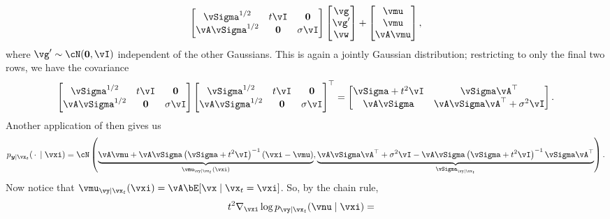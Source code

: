 \documentclass[../../book-main.tex]{subfiles}
\begin{document}
\begin{example}
\begin{equation}
\begin{bmatrix}
      \vSigma^{1/2} & t\vI & \Zero \\
      \vA \vSigma^{1/2} & \Zero & \sigma \vI
    \end{bmatrix}
    \begin{bmatrix}
      \vg \\
      \vg' \\
      \vw
    \end{bmatrix}
    +
    \begin{bmatrix}
      \vmu \\
      \vmu \\
      \vA\vmu
    \end{bmatrix},
  \end{equation}
  where $\vg' \sim \cN(\Zero, \vI)$ independent of the other Gaussians.
  This is again a jointly Gaussian distribution; restricting to only the final
  two rows, we have the covariance
  \begin{equation*}
    \begin{bmatrix}
      \vSigma^{1/2} & t\vI & \Zero \\
      \vA \vSigma^{1/2} & \Zero & \sigma \vI
    \end{bmatrix}
    \begin{bmatrix}
      \vSigma^{1/2} & t\vI & \Zero \\
      \vA \vSigma^{1/2} & \Zero & \sigma \vI
    \end{bmatrix}^\top
    =
    \begin{bmatrix}
      \vSigma + t^2\vI & \vSigma\vA^\top \\
      \vA\vSigma & \vA\vSigma\vA^\top + \sigma^2 \vI
    \end{bmatrix}.
  \end{equation*}
  Another application of  then gives us
  \begin{equation}
    p_{\y \mid \vx_t}(\spcdot \mid \vxi) = \cN\left(
    \underbrace{%
      \vA\vmu + \vA\vSigma\left( \vSigma + t^2 \vI \right)^{-1}
      \left(
        \vxi - \vmu
      \right)
      }_{\vmu_{\vy \mid \vx_t}(\vxi)},
      \underbrace{%
        \vA\vSigma\vA^\top + \sigma^2 \vI - \vA\vSigma \left( \vSigma
        + t^2 \vI\right)^{-1} \vSigma \vA^\top
      }_{\vSigma_{\vy\mid \vx_t}}
    \right).
  \end{equation}
  Now notice that $\vmu_{\vy \mid \vx_t}(\vxi) = \vA \bE[\vx \mid \vx_t=\vxi]$.
  So, by the chain rule,
  \begin{align*}
    t^2 \nabla_{\vxi} \log p_{\vy \mid \vx_t}(\vnu \mid \vxi)
    &=

\end{align*}
\end{example}
\end{document}
